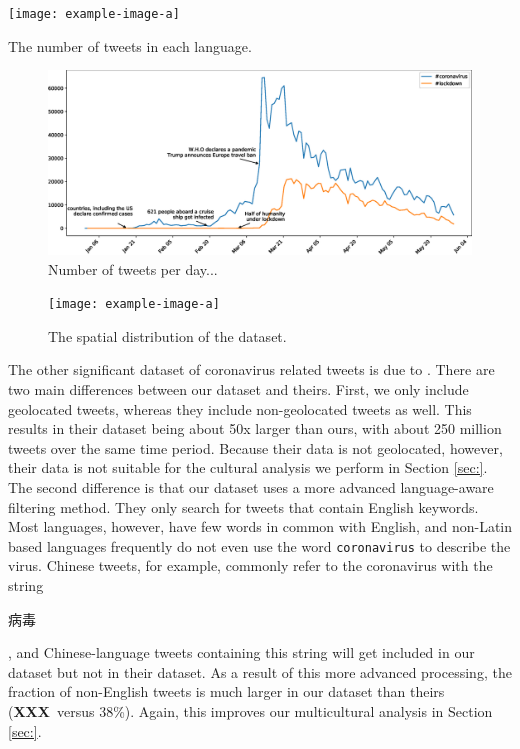 \documentclass[11pt]{article}
\newcommand{\XXX}{\textbf{XXX}~}
\begin{document}
\begin{table}
    \centering
    \texttt{[image: example-image-a]}
    \caption{The number of tweets in each language.} 
    \label{table:lang}
\end{table}

\begin{figure}
    \centering
    \includegraphics[width=\textwidth]{images/finalcountgraph1.eps}
    \caption{Number of tweets per day...}
    \label{fig:tweets_per_day}
\end{figure}

\begin{figure}
    \centering
    \texttt{[image: example-image-a]}
    \caption{The spatial distribution of the dataset.}
    \label{fig:corona:spatial}
\end{figure}

The other significant dataset of coronavirus related tweets is due to \citet{chen2020tracking}.
There are two main differences between our dataset and theirs.
First, we only include geolocated tweets,
whereas they include non-geolocated tweets as well.
This results in their dataset being about 50x larger than ours,
with about 250 million tweets over the same time period.
Because their data is not geolocated, however, their data is not suitable for the cultural analysis we perform in Section \ref{sec:}.
The second difference is that our dataset uses a more advanced language-aware filtering method.
They only search for tweets that contain English keywords.
Most languages, however, have few words in common with English,
and non-Latin based languages frequently do not even use the word \texttt{coronavirus} to describe the virus.
Chinese tweets, for example, commonly refer to the coronavirus with the string
\begin{CJK}{UTF8}{gbsn}
病毒
\end{CJK},
and Chinese-language tweets containing this string will get included in our dataset but not in their dataset.
As a result of this more advanced processing, the fraction of non-English tweets is much larger in our dataset than theirs (\XXX versus 38\%).
Again, this improves our multicultural analysis in Section \ref{sec:}.
\end{document}
